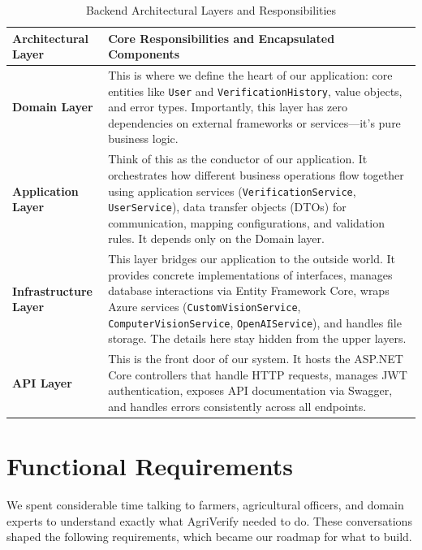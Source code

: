 \begin{table}[H]
  \centering
  \caption{Backend Architectural Layers and Responsibilities}
  \label{tab:backend_layers}
  \renewcommand{\arraystretch}{1.35}
  \begin{tabularx}{\textwidth}{@{} l X @{}}
    \toprule
    \textbf{Architectural Layer} & \textbf{Core Responsibilities and Encapsulated Components} \\
    \midrule
    \textbf{Domain Layer} & This is where we define the heart of our application: core entities like \texttt{User} and \texttt{VerificationHistory}, value objects, and error types. Importantly, this layer has zero dependencies on external frameworks or services---it's pure business logic. \\
    \addlinespace
    \textbf{Application Layer} & Think of this as the conductor of our application. It orchestrates how different business operations flow together using application services (\texttt{VerificationService}, \texttt{UserService}), data transfer objects (DTOs) for communication, mapping configurations, and validation rules. It depends only on the Domain layer. \\
    \addlinespace
    \textbf{Infrastructure Layer} & This layer bridges our application to the outside world. It provides concrete implementations of interfaces, manages database interactions via Entity Framework Core, wraps Azure services (\texttt{CustomVisionService}, \texttt{ComputerVisionService}, \texttt{OpenAIService}), and handles file storage. The details here stay hidden from the upper layers. \\
    \addlinespace
    \textbf{API Layer} & This is the front door of our system. It hosts the ASP.NET Core controllers that handle HTTP requests, manages JWT authentication, exposes API documentation via Swagger, and handles errors consistently across all endpoints. \\
    \bottomrule
  \end{tabularx}
\end{table}

\section{Functional Requirements}

We spent considerable time talking to farmers, agricultural officers, and
domain experts to understand exactly what AgriVerify needed to do. These
conversations shaped the following requirements, which became our roadmap for
what to build.

